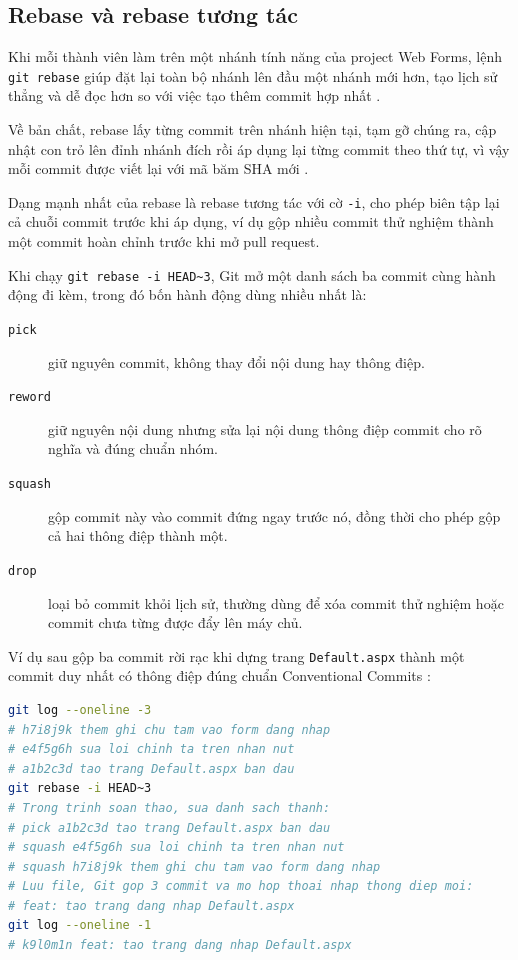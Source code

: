 \subsection{Rebase và rebase tương tác}
\label{sec:c32-rebase}

Khi mỗi thành viên làm trên một nhánh tính năng của project Web Forms, lệnh \verb|git rebase| giúp đặt lại toàn bộ nhánh lên đầu một nhánh mới hơn, tạo lịch sử thẳng và dễ đọc hơn so với việc tạo thêm commit hợp nhất \cite{progit}.

Về bản chất, rebase lấy từng commit trên nhánh hiện tại, tạm gỡ chúng ra, cập nhật con trỏ lên đỉnh nhánh đích rồi áp dụng lại từng commit theo thứ tự, vì vậy mỗi commit được viết lại với mã băm SHA mới \cite{atlassiangit}.

Dạng mạnh nhất của rebase là rebase tương tác với cờ \verb|-i|, cho phép biên tập lại cả chuỗi commit trước khi áp dụng, ví dụ gộp nhiều commit thử nghiệm thành một commit hoàn chỉnh trước khi mở pull request.

Khi chạy \verb|git rebase -i HEAD~3|, Git mở một danh sách ba commit cùng hành động đi kèm, trong đó bốn hành động dùng nhiều nhất là:

\begin{description}
\item[\texttt{pick}] giữ nguyên commit, không thay đổi nội dung hay thông điệp.
\item[\texttt{reword}] giữ nguyên nội dung nhưng sửa lại nội dung thông điệp commit cho rõ nghĩa và đúng chuẩn nhóm.
\item[\texttt{squash}] gộp commit này vào commit đứng ngay trước nó, đồng thời cho phép gộp cả hai thông điệp thành một.
\item[\texttt{drop}] loại bỏ commit khỏi lịch sử, thường dùng để xóa commit thử nghiệm hoặc commit chưa từng được đẩy lên máy chủ.
\end{description}

Ví dụ sau gộp ba commit rời rạc khi dựng trang \verb|Default.aspx| thành một commit duy nhất có thông điệp đúng chuẩn Conventional Commits \cite{convcommits}:

\begin{lstlisting}[language=bash, caption={Gop ba commit thanh mot commit bang rebase tuong tac}, label={lst:c32-rebase-squash}]
git log --oneline -3
# h7i8j9k them ghi chu tam vao form dang nhap
# e4f5g6h sua loi chinh ta tren nhan nut
# a1b2c3d tao trang Default.aspx ban dau
git rebase -i HEAD~3
# Trong trinh soan thao, sua danh sach thanh:
# pick a1b2c3d tao trang Default.aspx ban dau
# squash e4f5g6h sua loi chinh ta tren nhan nut
# squash h7i8j9k them ghi chu tam vao form dang nhap
# Luu file, Git gop 3 commit va mo hop thoai nhap thong diep moi:
# feat: tao trang dang nhap Default.aspx
git log --oneline -1
# k9l0m1n feat: tao trang dang nhap Default.aspx
\end{lstlisting}

